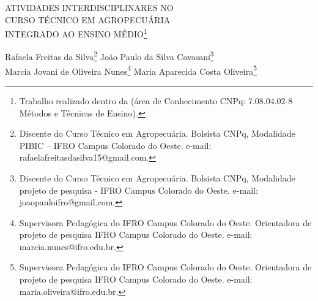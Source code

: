 \documentclass[article,12pt,onesidea,4paper,english,brazil]{abntex2}
\begin{document}
	
	
	\frenchspacing 
	
	\begin{center}
		\LARGE ATIVIDADES INTERDISCIPLINARES NO\\CURSO TÉCNICO EM AGROPECUÁRIA
		\\INTEGRADO AO ENSINO MÉDIO\footnote{Trabalho realizado dentro da (área de Conhecimento CNPq: 7.08.04.02-8 Métodos e Técnicas de
			Ensino).}
		
		\normalsize
	Rafaela Freitas da Silva\footnote{Discente do Curso Técnico em Agropecuária. Bolsista CNPq, Modalidade PIBIC – IFRO Campus
		Colorado do Oeste. e-mail: rafaelafreitasdasilva15@gmail.com.} 
		João Paulo da Silva Cavasani\footnote{Discente do Curso Técnico em Agropecuária. Bolsista CNPq, Modalidade projeto de pesquisa - IFRO Campus Colorado do Oeste. e-mail: joaopauloifro@gmail.com.} \\
	Marcia Jovani de Oliveira Nunes\footnote{Supervisora Pedagógica do IFRO Campus Colorado do Oeste. Orientadora de projeto de pesquisa IFRO Campus Colorado do Oeste. e-mail: marcia.nunes@ifro.edu.br.} 
	Maria Aparecida Costa Oliveira\footnote{Supervisora Pedagógica do IFRO Campus Colorado do Oeste. Orientadora de projeto de pesquisa
		IFRO Campus Colorado do Oeste. e-mail: maria.oliveira@ifro.edu.br.} 
	\end{center}
	
\end{document}
